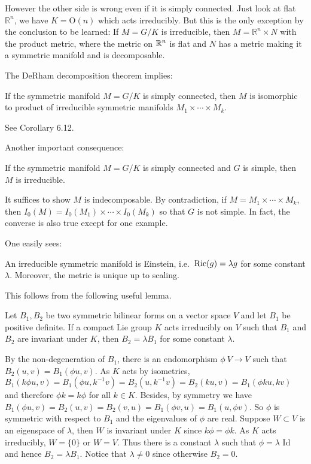 However the other side is wrong even if it is simply connected.
Just look at flat $\mathbb{R}^{n}$, we have $K = \mathrm{O}(n)$
which acts irreducibly. But this is  the only exception by the
conclusion to be learned: If $M = G / K$ is irreducible, then $M
= \mathbb{R}^{n} \times N$ with the product metric, where the
metric on ${\mathbb R}^n$ is flat and $N$ has a metric making it a
symmetric manifold and is decomposable.

 The DeRham decomposition theorem implies:
 
 \begin{corollary}
 	If the symmetric manifold $M = G / K$ is  simply connected,
 	then $M$ is isomorphic to product of irreducible symmetric
 	manifolds $M_1\times \cdots\times M_k$.
 \end{corollary}
\bproof
See \cite{Ziller} Corollary 6.12.
\eproof
 
 Another important consequence:
 \begin{corollary}
 	If the symmetric manifold $M = G / K$ is simply connected
 	and $G$ is simple, then $M$ is irreducible.
 \end{corollary}
\bproof
It suffices to show $M$ is indecomposable. By contradiction, if
$M = M_{1} \times \cdots \times M_{k}$, then $I_{0}(M) =
{I}_{0}\left( M_{1} \right) \times \cdots \times {I}_{0}\left(
M_{k} \right)$
so that $G$ is not simple. 
\eproof
In fact, the converse is also true  except for one example.

One easily sees:
\begin{corollary}\label{333}
	An irreducible symmetric manifold is Einstein, i.e.\
	$\mathrm{Ric}(g) =  \lambda g$ for some constant $\lambda$.
	Moreover, the metric is unique up to scaling.
\end{corollary}
\bproof
This follows from the following useful lemma.
\eproof
\begin{lemma}
	Let $B_{1}, B_{2}$ be two symmetric bilinear forms on a
	vector space $V$ and let $B_{1}$ be positive definite. If a
	compact Lie group $K$ acts irreducibly on $V$ such that
	$B_{1}$ and $B_{2}$ are invariant under $K$, then $B_{2} =
	\lambda B_{1}$ for some constant $\lambda$.
\end{lemma}
\bproof
By the non-degeneration of $B_{1}$, there is an endomorphism
$\phi\: V \rightarrow V$ such that $B_{2}(u, v) = B_{1}(\phi u,
v) .$ As $K$ acts by isometries, $B_{1}(k \phi u, v) =
B_{1}\left( \phi u, k^{-1} v \right) = B_{2}\left( u, k^{-1} v
\right)=B_{2}(k u, v) = B_{1}(\phi k u, k v)$ and therefore
$\phi k = k \phi$
for all $k \in K$. Besides, by symmetry we have $B_{1}(\phi u,
v) = B_{2}(u, v) = B_{2}(v, u) = B_{1}(\phi v, u) = B_{1}(u,
\phi v)$. So $\phi$ is symmetric with respect to $B_{1}$ and the
eigenvalues of $\phi$ are real. Suppose $W \subset V$ is an
eigenspace of $\lambda$, then $W$ is invariant under $K$ since
$k \phi=\phi k$. As $K$ acts irreducibly, $W = \{0\}$ or $W =
V$. Thus there is a constant $\lambda$ such that $\phi =
\lambda$ Id and hence $B_{2} = \lambda B_{1}$. Notice that
$\lambda \neq 0$ since otherwise
$B_{2} = 0$.
\eproof

